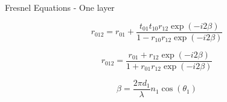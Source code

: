 \documentclass[10pt]{beamer}
\begin{document}
	\begin{frame}{Fresnel Equations - One layer}
	
	\begin{minipage}{0.47\textwidth}
	
	\begin{equation*} \label{eq:r012big}
	r_{012}=r_{01}+\frac{t_{01}t_{10}r_{12}\exp(-i2\beta)}{1-r_{10}r_{12}\exp(-i2\beta)}
	\end{equation*}
		
	\begin{equation*}\label{eq:2layerreflect}
	r_{012}= \frac{r_{01}+r_{12}\exp(-i2\beta)}{1+r_{01}r_{12}\exp(-i2\beta)}
	\end{equation*} 
	\end{minipage}
	\begin{minipage}{0.5\textwidth}
	\begin{equation*}
	\beta=\frac{2\pi d_1}{\lambda} n_1\cos(\theta_1)
	\end{equation*}
	\end{minipage}	
	\end{frame}
	
\end{document}
